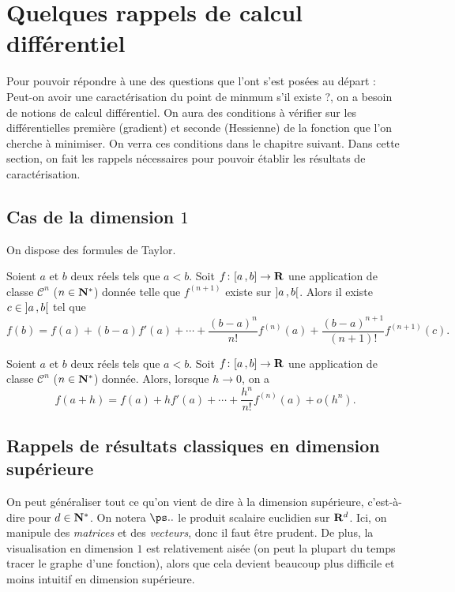 \documentclass[grape]{../ceri/sty/MasterNotes}
\begin{document}
\section{Quelques rappels de calcul différentiel}

Pour pouvoir répondre à une des questions que l'ont s'est posées au départ : \og Peut-on avoir une caractérisation du point de minmum s'il existe ?\fg, on a besoin de notions de calcul différentiel. On aura des conditions à vérifier sur les différentielles première (gradient) et seconde (Hessienne) de la fonction que l'on cherche à minimiser. On verra ces conditions dans le chapitre suivant. Dans cette section, on fait les rappels nécessaires pour pouvoir établir les résultats de caractérisation.

\subsection{Cas de la dimension $1$}

On dispose des formules de Taylor.

\begin{propo}
    Soient $a$ et $b$ deux réels tels que $a<b$. Soit $f\colon\mathopen{[}a\mathclose{}\mathpunct{},b\mathclose{]}\to\mathbf{R}$ une application de classe $\mathcal C^n$ ($n\in\mathbf{N}^*$) donnée telle que $f^{(n+1)}$ existe sur $\mathopen{]}a\mathclose{}\mathpunct{},b\mathclose{[}$. Alors il existe $c\in\mathopen{]}a\mathclose{}\mathpunct{},b\mathclose{[}$ tel que
    \[ f(b) = f(a) + (b-a)f'(a) + \cdots + \frac{(b-a)^n}{n!}f^{(n)}(a) + \frac{(b-a)^{n+1}}{(n+1)!}f^{(n+1)}(c). \]
\end{propo}

\begin{propo}
    Soient $a$ et $b$ deux réels tels que $a<b$. Soit $f\colon\mathopen{[}a\mathclose{}\mathpunct{},b\mathclose{]}\to\mathbf{R}$ une application de classe $\mathcal C^n$ ($n\in\mathbf{N}^*$) donnée. Alors, lorsque $h\to 0$, on a
    \[ f(a+h) = f(a) + hf'(a) + \cdots + \frac{h^n}{n!}f^{(n)}(a) + o(h^n). \]
\end{propo}

\subsection{Rappels de résultats classiques en dimension supérieure}

On peut généraliser tout ce qu'on vient de dire à la dimension supérieure, c'est-à-dire pour $d\in\mathbf{N}^*$. On notera $\ps..$ le produit scalaire euclidien sur $\mathbf{R}^d$. Ici, on manipule des \textit{matrices} et des \textit{vecteurs}, donc il faut être prudent. De plus, la visualisation en dimension $1$ est relativement aisée (on peut la plupart du temps tracer le graphe d'une fonction), alors que cela devient beaucoup plus difficile et moins intuitif en dimension supérieure.
\end{document}
